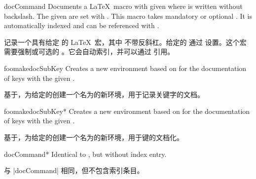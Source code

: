\begin{docEnvironment}[doclang/environment content=command description,doc updated=2020-04-22]
  {docCommand}{}
Documents a \LaTeX\ macro with given  where  is
written without backslash. The given  are set with .
This macro takes mandatory or optional .
It is automatically indexed and can be referenced with
.

记录一个具有给定  的 \LaTeX\ 宏，其中  不带反斜杠。给定的  通过  设置。这个宏需要强制或可选的 。它会自动索引，并可以通过  引用。
\begin{dispExample}
\begin{docCommand}{foomakedocSubKey}{}
Creates a new environment  based on  for the
documentation of keys with the given .

基于，为给定的创建一个名为的新环境，用于记录关键字的文档。
\end{docCommand}
\end{dispExample}
\begin{dispExample}
\begin{docCommand}[color definition=blue]{foomakedocSubKey*}%
  {}
Creates a new environment  based on  for the
documentation of keys with the given .

基于，为给定的创建一个名为的新环境，用于键的文档化。
\end{docCommand}
\end{dispExample}
\end{docEnvironment}

\begin{docEnvironment}[doclang/environment content=command description,doc updated=2020-04-22]
  {docCommand*}{}
Identical to , but without index entry.

与 |docCommand| 相同，但不包含索引条目。
\end{docEnvironment}

